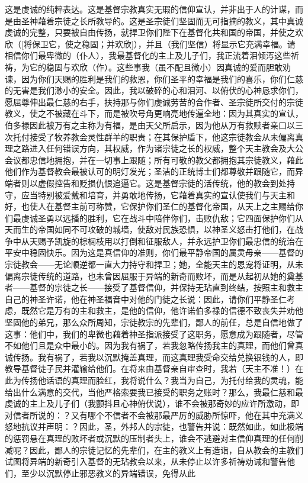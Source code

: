 这是虔诚的纯粹表达。这是基督宗教真实无瑕的信仰宣认，并非出于人的计谋，而是由圣神藉着宗徒之长所教导的。这是圣宗徒们坚固而无可指摘的教义，其中真诚虔诚的完整，只要被自由传扬，就捍卫你们陛下在基督化共和国的帝国，并使之欢欣（[将保卫它，使之稳固；并欢欣]），并且（我们坚信）将显示它充满幸福。请相信你们最卑微的（仆人），我最基督化的主上及儿子们，我正流着泪倾泻这些祈祷，为它的稳固与欢欣（作）。这些事我（虽不配且微小）因真诚的爱而胆敢劝谏，因为你们天赐的胜利是我们的救恩，你们圣平的幸福是我们的喜乐，你们仁慈的无害是我们渺小的安全。因此，我以破碎的心和泪河、以俯伏的心神恳求你们，愿屈尊伸出最仁慈的右手，扶持那与你们虔诚劳苦的合作者、圣宗徒所交付的宗徒教义，使之不被藏在斗下，而是被吹号角更响亮地传遍全地：因为其真实的宣认，伯多禄因此被万有之主称为有福，是由天父所启示，因为他从万有救赎者亲口以三次托付接受了牧养教会灵性群羊的职责；在其保护盾下，他这宗徒教会从未偏离真理之路进入任何错误方向，其权威，作为诸宗徒之长的权威，整个天主教会及大公会议都忠信地拥抱，并在一切事上跟随；所有可敬的教父都拥抱其宗徒教义，藉此他们作为基督教会最被认可的明灯发光；圣洁的正统博士们都尊敬并跟随它，而异端者则以虚假控告和贬损仇恨追逼它。这是基督宗徒的活传统，他的教会到处持守，应当特别被爱戴和培育，并勇敢地传扬，它藉着真实的宣认使我们与天主和好，也使人在基督主前可称赞，它保护你们圣仁的基督化帝国，从天上之主赐给你们最虔诚圣勇以远播的胜利，它在战斗中陪伴你们，击败仇敌；它四面保护你们从天而生的帝国如同不可攻破的城墙，使敌对民族恐惧，以神圣义怒击打他们，在战争中从天赐予凯旋的棕榈枝用以打倒和征服敌人，并永远护卫你们最忠信的统治在平安中稳固快乐。因为这是真信仰的准则，你们最平静帝国的属灵母亲——基督的宗徒教会——无论顺逆都一直大力持守和捍卫；她，全能天主的恩宠将证明，从未偏离宗徒传统的道路，也未曾因屈服于异端的新奇而败坏，而是从起初从她的奠基者——基督的宗徒之长——接受了基督信仰，并保持无玷直到终结，按照主和救主自己的神圣许诺，他在神圣福音中对他的门徒之长说：因此，请你们平静圣仁考虑，既然它是万有的主和救主，是他的信仰，他许诺伯多禄的信德不致丧失并劝他坚固他的弟兄，那么众所周知，宗徒教宗的先辈们，鄙人的前任，总是自信地做了这事：他们中，我们的卑微也藉着神圣指派接受了这职务，愿意成为跟随者，尽管不如他们且是众中最小的。因为我有祸了，若我忽略传扬我主的真理，而他们曾真诚传扬。我有祸了，若我以沉默掩盖真理，而这真理我受命交给兑换银钱的人，即教导基督徒子民并灌输给他们。在将来由基督亲自审查时，我若（天主不准！）在此为传扬他话语的真理而脸红，我将说什么？我当为自己，为托付给我的灵魂，能给出什么满意的交代，当他严格索要我已接受的职务之账时？那么，我最仁慈和最虔诚的主上及儿子们（我颤抖且心神俯伏说），谁不会被那奇妙的应许所激动，即对信者所说的：？又有哪个不信者不会被那最严厉的威胁所惊吓，他在其中充满义怒地抗议并声明：？因此，圣，外邦人的宗徒，也警告并说：既然如此，如此极端的惩罚悬在真理的败坏者或沉默的压制者头上，谁会不逃避对主信仰真理的任何削减呢？因此，鄙人的宗徒记忆的先辈们，在主的教义上有造诣，自从教会的主教们试图将异端的新奇引入基督的无玷教会以来，从未停止以许多祈祷劝诫和警告他们，至少以沉默停止邪恶教义的异端错误，免得从此